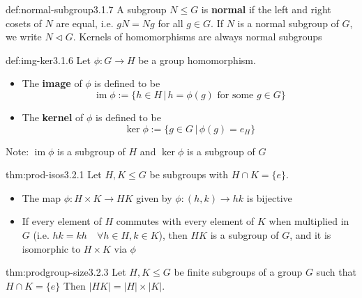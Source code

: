 \documentclass[landscape, 8pt]{extarticle}
\DeclareMathOperator{\Ima}{im}
\begin{document}
\begin{multicols}{3}
\begin{dfn}{def:normal-subgroup}{3.1.7}
    A subgroup $N\le G$ is \textbf{normal} if the left and right cosets of $N$ are equal, i.e. $gN = Ng$ for all $g\in G$. If $N$ is a normal subgroup of $G$, we write $N\triangleleft G$. Kernels of homomorphisms are always normal subgroups
\end{dfn}
\vspace{-5pt}

\begin{dfn}{def:img-ker}{3.1.6}
    Let $\phi:G\to H$ be a group homomorphism.
    \renewcommand\labelitemi{\tiny$\bullet$}
    \begin{itemize}
        \setlength\itemsep{0em}
        \item The \textbf{image} of $\phi$ is defined to be
        \[\Ima{\phi} := \{h\in H\,|\,h=\phi(g)\text{ for some } g\in G\}\]
        \item The \textbf{kernel} of $\phi$ is defined to be
        \[\ker{\phi}:= \{g\in G\,|\,\phi(g) = e_{H}\}\]
    \end{itemize}
    Note: $\Ima{\phi}$ is a subgroup of $H$ and $\ker{\phi}$ is a subgroup of $G$
\end{dfn}
\vspace{-5pt}

\begin{thm}{thm:prod-isos}{3.2.1}
Let $H,K\le G$ be subgroups with $H\cap K = \{e\}$.
\renewcommand\labelitemi{\tiny$\bullet$}
\begin{itemize}
    \setlength\itemsep{0em}
    \item The map $\phi:H\times K\to HK$ given by $\phi:(h,k)\to hk$ is bijective
    \item If every element of $H$ commutes with every element of $K$ when multiplied in $G$ (i.e. $hk=kh\quad \forall h\in H, k\in K$), then $HK$ is a subgroup of $G$, and it is isomorphic to $H\times K$ via $\phi$
\end{itemize}
\end{thm}
\vspace{-5pt}

\begin{thm}{thm:prodgroup-size}{3.2.3}
Let $H,K\le G$ be finite subgroups of a group $G$ such that $H\cap K = \{e\}$ Then $\lvert HK\rvert =\lvert H\rvert \times \lvert K\rvert $.
\end{thm}
\vspace{-5pt}



\end{multicols}
\end{document}
